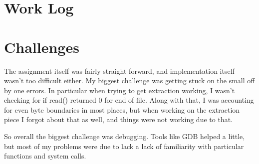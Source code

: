\documentclass[letterpaper,10pt]{article}
\begin{document}
\section{Work Log}


\section{Challenges}
The assignment itself was fairly straight forward, and implementation itself
wasn't too difficult either. My biggest challenge was getting stuck on the
small off by one errors. In particular when trying to get extraction working, I
wasn't checking for if read() returned 0 for end of file. Along with that, I
was accounting for even byte boundaries in most places, but when working on the
extraction piece I forgot about that as well, and things were not working due
to that.

So overall the biggest challenge was debugging. Tools like GDB helped a little,
but most of my problems were due to lack a lack of familiarity with particular
functions and system calls.
\end{document}
